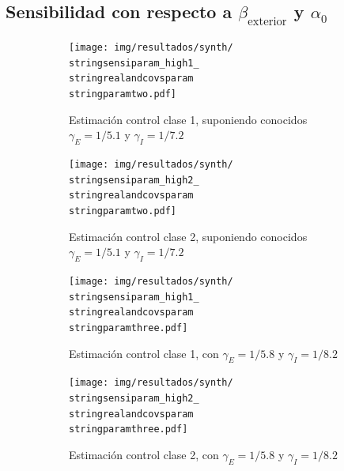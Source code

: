 \subsection{Sensibilidad con respecto a \(\beta_{\text{exterior}}\) y \(\alpha_0\)} \label{subsec:sensibeta}

\begin{figure}[H]
\centering
\begin{subfigure}[b]{0.47\textwidth}
     \centering
     \texttt{[image: img/resultados/synth/\\stringsensiparam\_high1\_\\stringrealandcovsparam\\stringparamtwo.pdf]}
     \caption{Estimación control clase 1, suponiendo conocidos \(\gamma_E = 1/5.1\) y \(\gamma_I = 1/7.2\)}
     \label{fig:legend-sensi-b-class1-gamma_real}
\end{subfigure} 
\hfill
\begin{subfigure}[b]{0.47\textwidth}
     \centering
     \texttt{[image: img/resultados/synth/\\stringsensiparam\_high2\_\\stringrealandcovsparam\\stringparamtwo.pdf]}
     \caption{Estimación control clase 2,  suponiendo conocidos \(\gamma_E = 1/5.1\) y \(\gamma_I = 1/7.2\)}
     \label{fig:legend-sensi-b-class2-gamma_real}
\end{subfigure} 
\hfill
\begin{subfigure}[b]{0.47\textwidth}
     \centering
     \texttt{[image: img/resultados/synth/\\stringsensiparam\_high1\_\\stringrealandcovsparam\\stringparamthree.pdf]}
     \caption{Estimación control clase 1,  con \(\gamma_E = 1/5.8\) y \(\gamma_I = 1/8.2\)}
     \label{fig:legend-sensi-b-class1-gamma_estimado}
\end{subfigure} 
\hfill
\begin{subfigure}[b]{0.47\textwidth}
     \centering
     \texttt{[image: img/resultados/synth/\\stringsensiparam\_high2\_\\stringrealandcovsparam\\stringparamthree.pdf]}
     \caption{Estimación control clase 2,  con \(\gamma_E = 1/5.8\) y \(\gamma_I = 1/8.2\)}
     \label{fig:legend-sensi-b-class2-gamma_estimado}
\end{subfigure} 
\hfill
\begin{subfigure}[b]{0.75\textwidth}

\end{subfigure}
\end{figure}
